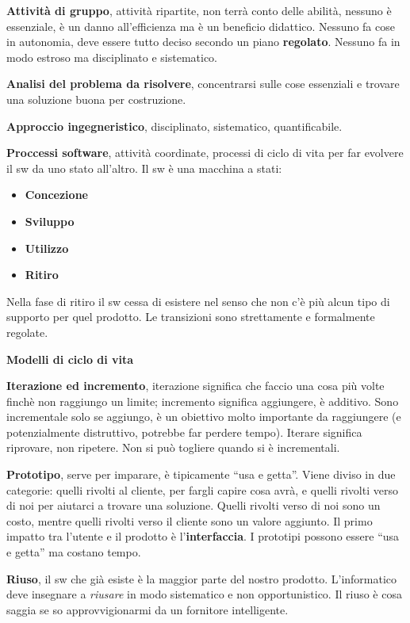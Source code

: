 \textbf{Attività di gruppo}, attività ripartite, non terrà conto delle abilità, nessuno è essenziale, è un danno all'efficienza ma è un beneficio didattico. Nessuno fa cose in autonomia, deve essere tutto deciso secondo un piano \textbf{regolato}. Nessuno fa in modo estroso ma disciplinato e sistematico.

\textbf{Analisi del problema da risolvere}, concentrarsi sulle cose essenziali e trovare una soluzione buona per costruzione.

\textbf{Approccio ingegneristico}, disciplinato, sistematico, quantificabile.

\textbf{Proccessi software}, attività coordinate, processi di ciclo di vita per far evolvere il sw da uno stato all'altro. Il sw è una macchina a stati:

\begin{itemize}

	\item \textbf{Concezione}
	\item \textbf{Sviluppo}
	\item \textbf{Utilizzo}
	\item \textbf{Ritiro}

\end{itemize}

Nella fase di ritiro il sw cessa di esistere nel senso che non c'è più alcun tipo di supporto per quel prodotto. Le transizioni sono strettamente e formalmente regolate.

\textbf{Modelli di ciclo di vita}

\textbf{Iterazione ed incremento}, iterazione significa che faccio una cosa più volte finchè non raggiungo un limite; incremento significa aggiungere, è additivo. Sono incrementale solo se aggiungo, è  un obiettivo molto importante da raggiungere (e potenzialmente distruttivo, potrebbe far perdere tempo). Iterare significa riprovare, non ripetere. Non si può togliere quando si è incrementali.

\textbf{Prototipo}, serve per imparare, è tipicamente “usa e getta”. Viene diviso in due categorie: quelli rivolti al cliente, per fargli capire cosa avrà, e quelli rivolti verso di noi per aiutarci a trovare una soluzione. Quelli rivolti verso di noi sono un costo, mentre quelli rivolti verso il cliente sono un valore aggiunto. Il primo impatto tra l'utente e il prodotto è l'\textbf{interfaccia}. I prototipi possono essere “usa e getta” ma costano tempo.

\textbf{Riuso}, il sw che già esiste è la maggior parte del nostro prodotto. L'informatico deve insegnare a \textit{riusare} in modo sistematico e non opportunistico. Il riuso è cosa saggia se so approvvigionarmi da un fornitore intelligente.

